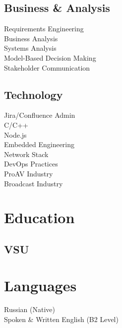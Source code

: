 \documentclass[]{private}
\begin{document}
\begin{paracol}{2}
    \subsection{Business \& Analysis}
    \vspace{\topsep}
    \textbullet{} Requirements Engineering \\
    \textbullet{} Business Analysis \\
    \textbullet{} Systems Analysis \\
    \textbullet{} Model-Based Decision Making \\
    \textbullet{} Stakeholder Communication
    \sectionsep
    
    \subsection{Technology}
    \vspace{\topsep}
    \textbullet{} Jira/Confluence Admin \\
    \textbullet{} C/C++ \\
    \textbullet{} Node.js \\
    \textbullet{} Embedded Engineering \\
    \textbullet{} Network Stack \\
    \textbullet{} DevOps Practices \\
    \textbullet{} ProAV Industry \\
    \textbullet{} Broadcast Industry
    
    
    \section{Education} 
    \subsection{VSU}
    \sectionsep
    
    
    \section{Languages} 
    \textbullet{} Russian (Native) \\ 
    \textbullet{} Spoken \& Written English (B2 Level)
    \sectionsep
    \\[8pt]
    

\end{paracol}
\end{document}
